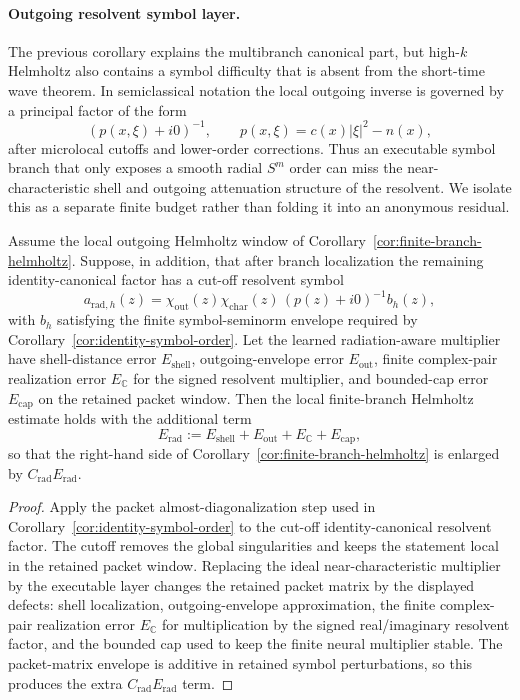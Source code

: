\paragraph{Outgoing resolvent symbol layer.}
The previous corollary explains the multibranch canonical part, but high-$k$ Helmholtz also contains a symbol difficulty that is absent from the short-time wave theorem.  In semiclassical notation the local outgoing inverse is governed by a principal factor of the form
\[
(p(x,\xi)+i0)^{-1},
\qquad
p(x,\xi)=c(x)|\xi|^2-n(x),
\]
after microlocal cutoffs and lower-order corrections.  Thus an executable symbol branch that only exposes a smooth radial $S^m$ order can miss the near-characteristic shell and outgoing attenuation structure of the resolvent.  We isolate this as a separate finite budget rather than folding it into an anonymous residual.

\begin{corollary}
\label{cor:helmholtz-resolvent-symbol-budget}
Assume the local outgoing Helmholtz window of Corollary~\ref{cor:finite-branch-helmholtz}.  Suppose, in addition, that after branch localization the remaining identity-canonical factor has a cut-off resolvent symbol
\[
a_{\mathrm{rad},h}(z)
=
\chi_{\mathrm{out}}(z)\chi_{\mathrm{char}}(z)
\,(p(z)+i0)^{-1}b_h(z),
\]
with $b_h$ satisfying the finite symbol-seminorm envelope required by Corollary~\ref{cor:identity-symbol-order}.  Let the learned radiation-aware multiplier have shell-distance error $E_{\mathrm{shell}}$, outgoing-envelope error $E_{\mathrm{out}}$, finite complex-pair realization error $E_{\mathbb C}$ for the signed resolvent multiplier, and bounded-cap error $E_{\mathrm{cap}}$ on the retained packet window.  Then the local finite-branch Helmholtz estimate holds with the additional term
\[
E_{\mathrm{rad}}
:=
E_{\mathrm{shell}}+E_{\mathrm{out}}+E_{\mathbb C}+E_{\mathrm{cap}},
\]
so that the right-hand side of Corollary~\ref{cor:finite-branch-helmholtz} is enlarged by $C_{\mathrm{rad}}E_{\mathrm{rad}}$.
\end{corollary}

\begin{proof}
Apply the packet almost-diagonalization step used in Corollary~\ref{cor:identity-symbol-order} to the cut-off identity-canonical resolvent factor.  The cutoff removes the global singularities and keeps the statement local in the retained packet window.  Replacing the ideal near-characteristic multiplier by the executable layer changes the retained packet matrix by the displayed defects: shell localization, outgoing-envelope approximation, the finite complex-pair realization error $E_{\mathbb C}$ for multiplication by the signed real/imaginary resolvent factor, and the bounded cap used to keep the finite neural multiplier stable.  The packet-matrix envelope is additive in retained symbol perturbations, so this produces the extra $C_{\mathrm{rad}}E_{\mathrm{rad}}$ term.
\end{proof}

